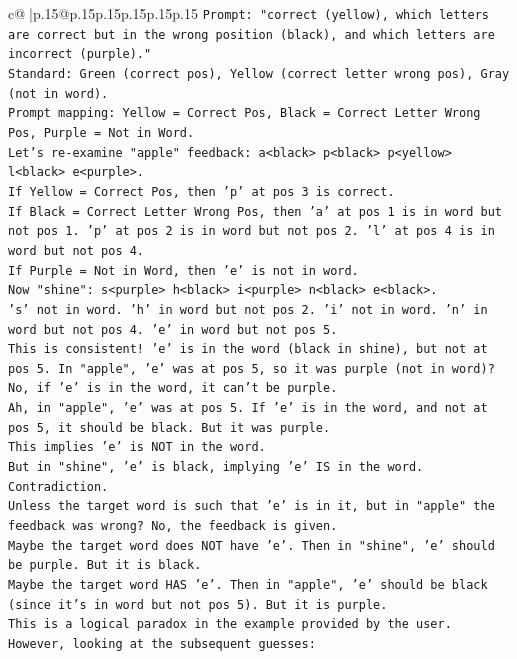 \documentclass{article}
\begin{document}
{\begin{supertabular}{c@{$\;$}|p{.15\linewidth}@{}p{.15\linewidth}p{.15\linewidth}p{.15\linewidth}p{.15\linewidth}p{.15\linewidth}}
{{{\texttt{Prompt: "correct (yellow), which letters are correct but in the wrong position (black), and which letters are incorrect (purple)."} \\
\texttt{Standard: Green (correct pos), Yellow (correct letter wrong pos), Gray (not in word).} \\
\texttt{Prompt mapping: Yellow = Correct Pos, Black = Correct Letter Wrong Pos, Purple = Not in Word.} \\
\texttt{Let's re{-}examine "apple" feedback: a<black> p<black> p<yellow> l<black> e<purple>.} \\
\texttt{If Yellow = Correct Pos, then 'p' at pos 3 is correct.} \\
\texttt{If Black = Correct Letter Wrong Pos, then 'a' at pos 1 is in word but not pos 1. 'p' at pos 2 is in word but not pos 2. 'l' at pos 4 is in word but not pos 4.} \\
\texttt{If Purple = Not in Word, then 'e' is not in word.} \\
\texttt{Now "shine": s<purple> h<black> i<purple> n<black> e<black>.} \\
\texttt{'s' not in word. 'h' in word but not pos 2. 'i' not in word. 'n' in word but not pos 4. 'e' in word but not pos 5.} \\
\texttt{This is consistent! 'e' is in the word (black in shine), but not at pos 5. In "apple", 'e' was at pos 5, so it was purple (not in word)? No, if 'e' is in the word, it can't be purple.} \\
\texttt{Ah, in "apple", 'e' was at pos 5. If 'e' is in the word, and not at pos 5, it should be black. But it was purple.} \\
\texttt{This implies 'e' is NOT in the word.} \\
\texttt{But in "shine", 'e' is black, implying 'e' IS in the word.} \\
\texttt{Contradiction.} \\
\texttt{Unless the target word is such that 'e' is in it, but in "apple" the feedback was wrong? No, the feedback is given.} \\
\texttt{Maybe the target word does NOT have 'e'. Then in "shine", 'e' should be purple. But it is black.} \\
\texttt{Maybe the target word HAS 'e'. Then in "apple", 'e' should be black (since it's in word but not pos 5). But it is purple.} \\
\texttt{This is a logical paradox in the example provided by the user.} \\
\texttt{However, looking at the subsequent guesses:} \\
}}}
\end{supertabular}}
\end{document}
